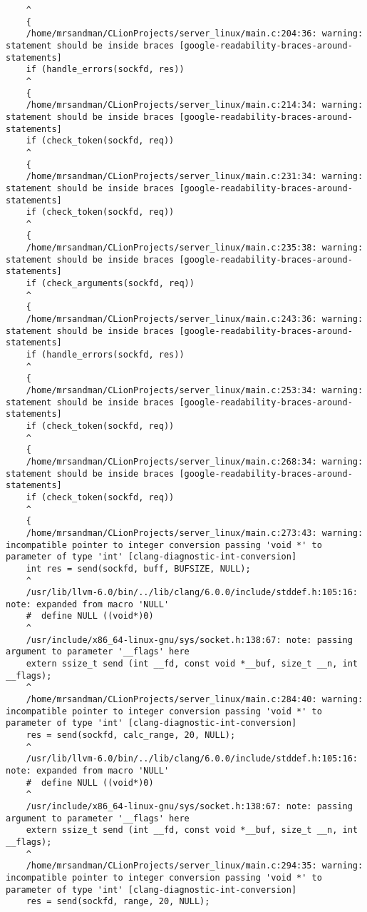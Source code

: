 \begin{itemize}
\begin{lstlisting}
	^
	{
	/home/mrsandman/CLionProjects/server_linux/main.c:204:36: warning: statement should be inside braces [google-readability-braces-around-statements]
	if (handle_errors(sockfd, res))
	^
	{
	/home/mrsandman/CLionProjects/server_linux/main.c:214:34: warning: statement should be inside braces [google-readability-braces-around-statements]
	if (check_token(sockfd, req))
	^
	{
	/home/mrsandman/CLionProjects/server_linux/main.c:231:34: warning: statement should be inside braces [google-readability-braces-around-statements]
	if (check_token(sockfd, req))
	^
	{
	/home/mrsandman/CLionProjects/server_linux/main.c:235:38: warning: statement should be inside braces [google-readability-braces-around-statements]
	if (check_arguments(sockfd, req))
	^
	{
	/home/mrsandman/CLionProjects/server_linux/main.c:243:36: warning: statement should be inside braces [google-readability-braces-around-statements]
	if (handle_errors(sockfd, res))
	^
	{
	/home/mrsandman/CLionProjects/server_linux/main.c:253:34: warning: statement should be inside braces [google-readability-braces-around-statements]
	if (check_token(sockfd, req))
	^
	{
	/home/mrsandman/CLionProjects/server_linux/main.c:268:34: warning: statement should be inside braces [google-readability-braces-around-statements]
	if (check_token(sockfd, req))
	^
	{
	/home/mrsandman/CLionProjects/server_linux/main.c:273:43: warning: incompatible pointer to integer conversion passing 'void *' to parameter of type 'int' [clang-diagnostic-int-conversion]
	int res = send(sockfd, buff, BUFSIZE, NULL);
	^
	/usr/lib/llvm-6.0/bin/../lib/clang/6.0.0/include/stddef.h:105:16: note: expanded from macro 'NULL'
	#  define NULL ((void*)0)
	^
	/usr/include/x86_64-linux-gnu/sys/socket.h:138:67: note: passing argument to parameter '__flags' here
	extern ssize_t send (int __fd, const void *__buf, size_t __n, int __flags);
	^
	/home/mrsandman/CLionProjects/server_linux/main.c:284:40: warning: incompatible pointer to integer conversion passing 'void *' to parameter of type 'int' [clang-diagnostic-int-conversion]
	res = send(sockfd, calc_range, 20, NULL);
	^
	/usr/lib/llvm-6.0/bin/../lib/clang/6.0.0/include/stddef.h:105:16: note: expanded from macro 'NULL'
	#  define NULL ((void*)0)
	^
	/usr/include/x86_64-linux-gnu/sys/socket.h:138:67: note: passing argument to parameter '__flags' here
	extern ssize_t send (int __fd, const void *__buf, size_t __n, int __flags);
	^
	/home/mrsandman/CLionProjects/server_linux/main.c:294:35: warning: incompatible pointer to integer conversion passing 'void *' to parameter of type 'int' [clang-diagnostic-int-conversion]
	res = send(sockfd, range, 20, NULL);

\end{lstlisting}
\end{itemize}
